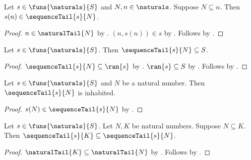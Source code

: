 \begin{proposition}\label{sequence_tail_contains_term}
    Let $s\in\funs{\naturals}{S}$ and $N,n\in\naturals$.
    Suppose $N\subseteq n$.
    Then $s(n)\in\sequenceTail{s}{N}$.
\end{proposition}
\begin{proof}
    $n\in\naturalTail{N}$ by .
    $(n,s(n))\in s$ by .
    Follows by .
\end{proof}

\begin{proposition}\label{sequence_tail_type}
    Let $s\in\funs{\naturals}{S}$.
    Then $\sequenceTail{s}{N}\subseteq S$.
\end{proposition}
\begin{proof}
    $\sequenceTail{s}{N}\subseteq\ran{s}$
        by .
    $\ran{s}\subseteq S$ by .
    Follows by .
\end{proof}

\begin{proposition}\label{sequence_tail_inhabited}
    Let $s\in\funs{\naturals}{S}$ and $N$ be a natural number.
    Then $\sequenceTail{s}{N}$ is inhabited.
\end{proposition}
\begin{proof}
    $s(N)\in\sequenceTail{s}{N}$
        by .
\end{proof}

\begin{proposition}\label{sequence_tail_antitone}
    Let $s\in\funs{\naturals}{S}$.
    Let $N,K$ be natural numbers.
    Suppose $N\subseteq K$.
    Then $\sequenceTail{s}{K}\subseteq\sequenceTail{s}{N}$.
\end{proposition}
\begin{proof}
    $\naturalTail{K}\subseteq\naturalTail{N}$
        by .
    Follows by .
\end{proof}

